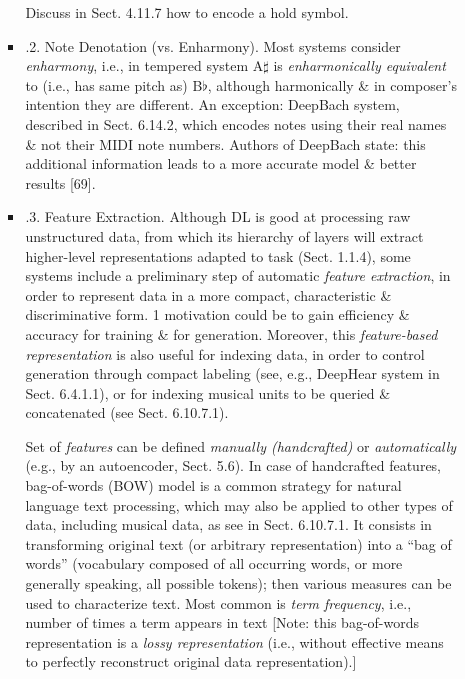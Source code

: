 \documentclass{article}
\begin{document}
\begin{itemize}
\begin{itemize}
\begin{itemize}
			Discuss in Sect. 4.11.7 how to encode a hold symbol.
			\item {.2. Note Denotation (vs. Enharmony).} Most systems consider {\it enharmony}, i.e., in tempered system A$\sharp$ is {\it enharmonically equivalent} to (i.e., has same pitch as) B$\flat$, although harmonically \& in composer's intention they are different. An exception: DeepBach system, described in Sect. 6.14.2, which encodes notes using their real names \& not their MIDI note numbers. Authors of DeepBach state: this additional information leads to a more accurate model \& better results [69].
			\item {.3. Feature Extraction.} Although DL is good at processing raw unstructured data, from which its hierarchy of layers will extract higher-level representations adapted to task (Sect. 1.1.4), some systems include a preliminary step of automatic {\it feature extraction}, in order to represent data in a more compact, characteristic \& discriminative form. 1 motivation could be to gain efficiency \& accuracy for training \& for generation. Moreover, this {\it feature-based representation} is also useful for indexing data, in order to control generation through compact labeling (see, e.g., DeepHear system in Sect. 6.4.1.1), or for indexing musical units to be queried \& concatenated (see Sect. 6.10.7.1).

			Set of {\it features} can be defined {\it manually (handcrafted)} or {\it automatically} (e.g., by an autoencoder, Sect. 5.6). In case of handcrafted features, bag-of-words (BOW) model is a common strategy for natural language text processing, which may also be applied to other types of data, including musical data, as see in Sect. 6.10.7.1. It consists in transforming original text (or arbitrary representation) into a ``bag of words'' (vocabulary composed of all occurring words, or more generally speaking, all possible tokens); then various measures can be used to characterize text. Most common is {\it term frequency}, i.e., number of times a term appears in text [Note: this bag-of-words representation is a {\it lossy representation} (i.e., without effective means to perfectly reconstruct original data representation).]


\end{itemize}
\end{itemize}
\end{itemize}
\end{document}
